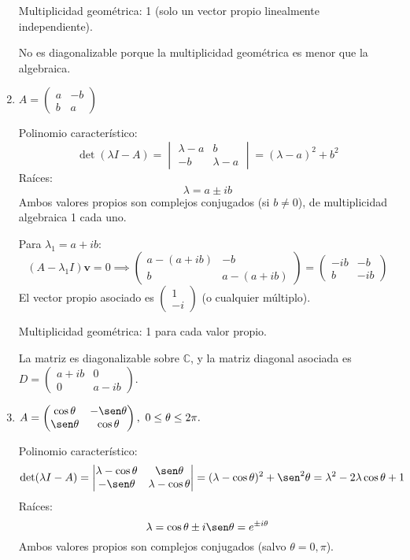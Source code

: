 \begin{prob}
\begin{enumerate}[$a)$]
\begin{myproof}
Multiplicidad geométrica: 1 (solo un vector propio linealmente independiente).

No es diagonalizable porque la multiplicidad geométrica es menor que la algebraica.
\end{myproof}

\item $A=\left(\begin{matrix}
a & -b \\ b & a
\end{matrix}\right)$

\begin{myproof}
Polinomio característico:
\[
\det(\lambda I - A) = \begin{vmatrix} \lambda-a & b \\ -b & \lambda-a \end{vmatrix} = (\lambda-a)^2 + b^2
\]
Raíces:
\[
\lambda = a \pm ib
\]
Ambos valores propios son complejos conjugados (si $b\neq 0$), de multiplicidad algebraica 1 cada uno.

Para $\lambda_1 = a + ib$:
\[
(A - \lambda_1 I)\mathbf{v} = 0 \implies \begin{pmatrix} a-(a+ib) & -b \\ b & a-(a+ib) \end{pmatrix} = \begin{pmatrix} -ib & -b \\ b & -ib \end{pmatrix}
\]
El vector propio asociado es $\begin{pmatrix} 1 \\ -i \end{pmatrix}$ (o cualquier múltiplo).

Multiplicidad geométrica: 1 para cada valor propio.

La matriz es diagonalizable sobre $\mathbb{C}$, y la matriz diagonal asociada es $D = \begin{pmatrix} a+ib & 0 \\ 0 & a-ib \end{pmatrix}$.
\end{myproof}

\item $A=\left(\begin{matrix}
\cos \theta & -\sen \theta \\ \sen \theta & \cos \theta
\end{matrix}\right),\ 0\leq \theta \leq 2\pi.$

\begin{myproof}
Polinomio característico:
\[
\det(\lambda I - A) = \begin{vmatrix} \lambda-\cos\theta & \sen\theta \\ -\sen\theta & \lambda-\cos\theta \end{vmatrix} = (\lambda-\cos\theta)^2 + \sen^2\theta = \lambda^2 - 2\lambda\cos\theta + 1
\]
Raíces:
\[
\lambda = \cos\theta \pm i\sen\theta = e^{\pm i\theta}
\]
Ambos valores propios son complejos conjugados (salvo $\theta=0,\pi$).


\end{myproof}
\end{enumerate}
\end{prob}
